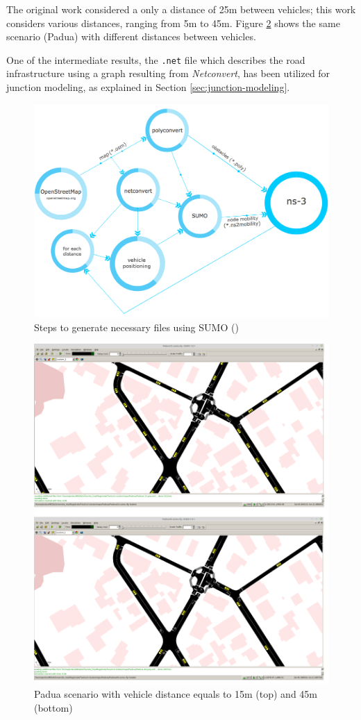 		The original work considered a only a distance of 25m between vehicles; this work considers various distances, ranging from 5m to 45m. Figure \ref{fig:sumo-distances}  shows the same scenario (Padua) with different distances between vehicles.
		
		
		One of the intermediate results, the \texttt{.net} file which describes the road infrastructure using a graph resulting from \textit{Netconvert}, has been utilized for junction modeling, as explained in Section \ref{sec:junction-modeling}.
		\begin{figure}[H]
			\centering
			\includegraphics[width=\textwidth]{immagini/sumo-process}
			\caption{Steps to generate necessary files using SUMO (\cite{ROM2017})}
			\label{fig:sumo-process}
		\end{figure}
		
		\begin{figure}[H]
			\centering
			\includegraphics[width=\textwidth]{immagini/sumo-distances}
			\caption{Padua scenario with vehicle distance equals to 15m (top) and 45m (bottom)}
			\label{fig:sumo-distances}
		\end{figure}
